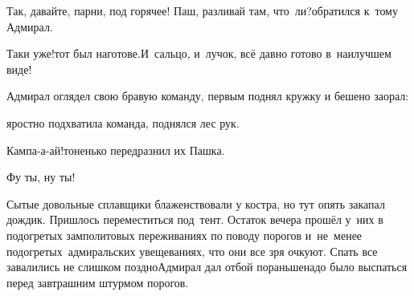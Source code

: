 
\diagdash Так, давайте, парни, под горячее! Паш, разливай там, что~ли?\mdash обратился к~тому Адмирал.

\diagdash Таки уже!\mdash тот был наготове.\mdash И~сальцо, и~лучок, всё давно готово в~наилучшем виде!

Адмирал оглядел свою бравую команду, первым поднял кружку и бешено заорал:


\mdash яростно подхватила команда, поднялся лес рук.

\diagdash Кампа-а-ай!\mdash тоненько передразнил их Пашка.

\diagdash Фу ты, ну ты!


Сытые довольные сплавщики блаженствовали у костра, но тут опять закапал дождик. Пришлось переместиться под~тент.
Остаток вечера прошёл у~них в подогретых замполитовых переживаниях по поводу порогов и~не~менее подогретых~адмиральских увещеваниях, что они все зря очкуют.
Спать все завалились не слишком поздно\mdash Адмирал дал отбой пораньше\mdash надо было выспаться перед завтрашним штурмом порогов.

\begin{center}
\end{center}
